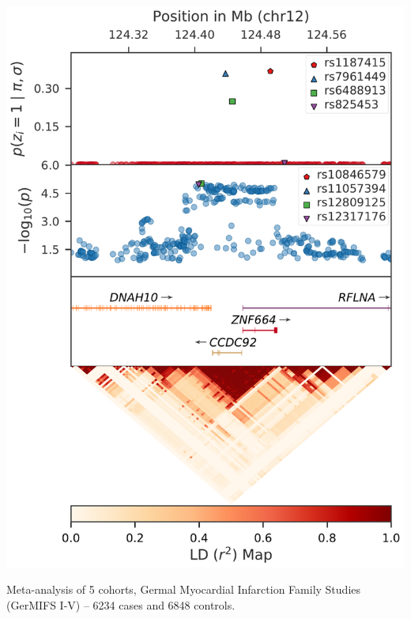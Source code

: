 \documentclass[a0paper,portrait,debug]{baposter}
\begin{document}
\begin{poster}
{\begin{center}
    \includegraphics[height=\myfigheight, keepaspectratio]{Locus_013.pdf}
  \end{center}
Meta-analysis of 5 cohorts, Germal Myocardial Infarction Family Studies (GerMIFS I-V) -- 6234 cases and 6848 controls.
}


\end{poster}
\end{document}

